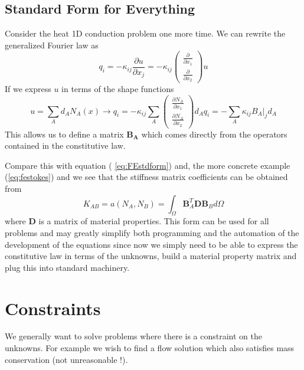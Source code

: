 \documentclass[10pt]{article}
\begin{document}
	\subsection{Standard Form for Everything }
	
	Consider the heat 1D conduction problem one more time. We can rewrite
	the generalized Fourier law as
		\begin{equation}
				q_i = - \kappa_{ij} \frac{\partial u}{\partial x_j} =
				 -\kappa_{ij} \left( \begin{array}{c} \frac{\partial}{\partial x_1} \\ \frac{\partial }{\partial x_2} \end{array} \right) u
		\end{equation}
	If we express $u$ in terms of the shape functions
		\begin{equation}
			u = \sum_A d_A N_A (x)  \rightarrow 
			q_i = -\kappa_{ij} \sum_A \left( \begin{array}{c} {\displaystyle \frac{\partial N_A}{\partial x_1}} \\ 
			{ \displaystyle \frac{\partial N_A}{\partial x_2}} \end{array} \right) d_A
			q_i = - \sum_A \kappa_{ij} \left. B_A \right|_{j} d_A
		\end{equation}
	This allows us to define a matrix $\mathbf{B_A}$ which comes directly 
	from the operators contained in the constitutive law.
	
	Compare this with equation ( \ref{eq:FEstdform}) and, the more
	concrete example (\ref{eq:festokes}) and we see that the stiffness matrix 
	coefficients can be obtained from
		\begin{equation}
				K_{AB} = a(N_A,N_B) = \int_{\Omega} \mathbf{B}_A^T \mathbf{D} \mathbf{B}_B d\Omega
		\end{equation}
	where $\mathbf{D}$ is a matrix of material properties.  This 
	form can be used for all problems and may greatly simplify 
	both programming and the automation of the development of the
	equations since now we simply need to be able
	to express the constitutive law in terms of the unknowns, build
	a material property matrix and plug this into standard machinery.
	 
 \section{Constraints}
		
 We generally want to solve problems where there is a constraint on the
 unknowns. For example we wish to find a flow solution which also satisfies mass
 conservation (not unreasonable !).
 		
\end{document}
